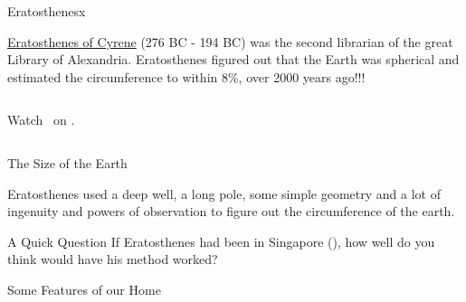 \begin{myFrame}{Eratosthenes}{x}

\setCol
\begin{itemize}
\col \href{http://en.wikipedia.org/wiki/Eratosthenes}{Eratosthenes of Cyrene} (276 BC - 194 BC) was the second librarian of the great Library of Alexandria.
\col Eratosthenes figured out that the Earth was spherical and estimated the circumference to within 8\%, over 2000 years ago!!!
\end{itemize}

\begin{columns}

\centerline{Watch \vidErato\ on  \you[0.175]{}.}
\end{columns}

\end{myFrame}

\begin{myFrame}{The Size of the Earth}{}

\setCol
\begin{itemize}
\col Eratosthenes used a deep well, a long pole, some simple geometry and a lot of ingenuity and powers of observation to figure out the circumference of the earth.
\end{itemize}

\begin{myBlock}[0.85\textwidth]{\centering A Quick Question}\centering
If Eratosthenes had been in Singapore (\smiley{}), how well do you think would have his method worked?
\end{myBlock}

\end{myFrame}

\begin{myFrame}{Some Features of our Home}{}
	\medskip
\end{myFrame}


